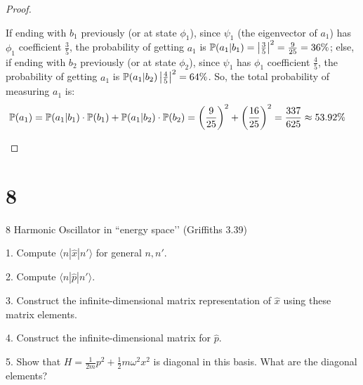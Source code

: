 \documentclass{article}
\begin{document}
\begin{proof}
\begin{enumerate}
        If ending with $b_1$ previously (or at state $\phi_1$), since $\psi_1$ (the eigenvector of $a_1$) has $\phi_1$ coefficient $\frac{3}{5}$, the probability of getting $a_1$ is $\mathbb{P}(a_1|b_1)=\left|\frac{3}{5}\right|^2 = \frac{9}{25}=36\%$; else, if ending with $b_2$ previously (or at state $\phi_2$), since $\psi_1$ has $\phi_1$ coefficient $\frac{4}{5}$, the probability of getting $a_1$ is $\mathbb{P}(a_1|b_2)\left|\frac{4}{5}\right|^2 = 64\%$. So, the total probability of measuring $a_1$ is:
        \begin{align}
            \mathbb{P}(a_1) &= \mathbb{P}(a_1|b_1)\cdot\mathbb{P}(b_1) + \mathbb{P}(a_1|b_2)\cdot\mathbb{P}(b_2) = \left(\frac{9}{25}\right)^2+\left(\frac{16}{25}\right)^2=\frac{337}{625} \approx 53.92\%
        \end{align}
    \end{enumerate}
\end{proof}

\newpage

\section*{8}
\begin{ques}\label{q8}
8 Harmonic Oscillator in “energy space’’ (Griffiths 3.39)

1. Compute $\langle n|\hat{x}|n'\rangle$ for general $n,n'$.

2. Compute $\langle n|\hat{p}|n'\rangle$.

3. Construct the infinite-dimensional matrix representation of $\hat{x}$ using these matrix elements.

4. Construct the infinite-dimensional matrix for $\hat{p}$.

5. Show that $H = \frac{1}{2m}p^2 + \frac{1}{2}m\omega^2 x^2$ is diagonal in this basis. What are the diagonal elements?
\end{ques}
\end{document}
